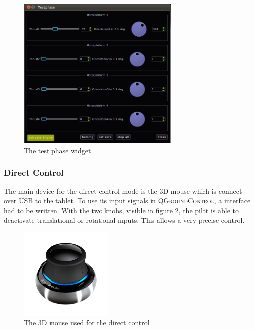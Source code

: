 \begin{figure}[H] %
	\begin{center}
		\includegraphics[width=0.7\textwidth]{qgc_test_phase}
		\caption{The test phase widget }  
		\label{figure:qgc_test_phase}
	\end{center}
\end{figure}


\subsubsection{Direct Control}
The main device for the direct control mode is the 3D mouse which is connect over USB to the tablet. To use its input signals in  \textsc{QGroundControl}, a interface had to be written. With the two knobs, visible in figure \ref{fig:3D_mouse}, the pilot is able to deactivate translational or rotational inputs. This allows a very precise control.

\begin{figure}[H] %
	\begin{center}
		\includegraphics[width=0.4\textwidth]{3dx_productimage}
		\caption{The 3D mouse used for the direct control }  
		\label{fig:3D_mouse}
	\end{center}
\end{figure}


